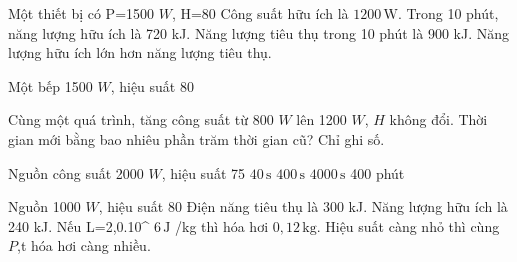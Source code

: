 \begin{ex}
Một thiết bị có P=1500 $W$, H=80%
\choiceTF
{\True Công suất hữu ích là $1200\,\text{W}$.}
{\True Trong 10 phút, năng lượng hữu ích là 720 kJ.}
{\True Năng lượng tiêu thụ trong 10 phút là 900 kJ.}
{Năng lượng hữu ích lớn hơn năng lượng tiêu thụ.}
\end{ex}

\begin{bt}
Một bếp 1500 $W$, hiệu suất 80%
\end{bt}

\begin{ex}
Cùng một quá trình, tăng công suất từ 800 $W$ lên 1200 $W$, $H$ không đổi. Thời gian mới bằng bao nhiêu phần trăm thời gian cũ? Chỉ ghi số.
\end{ex}

\begin{ex}
Nguồn công suất 2000 $W$, hiệu suất 75%
\choice
{$40\,\text{s}$}
{\True $400\,\text{s}$}
{$4000\,\text{s}$}
{400 phút}
\end{ex}

\begin{ex}
Nguồn 1000 $W$, hiệu suất 80%
\choiceTF
{\True Điện năng tiêu thụ là 300 kJ.}
{\True Năng lượng hữu ích là 240 kJ.}
{\True Nếu L=2,0.10^ $6\,\text{J}$ /kg thì hóa hơi $0,12\,\text{kg}$.}
{Hiệu suất càng nhỏ thì cùng $P$,t hóa hơi càng nhiều.}
\end{ex}


